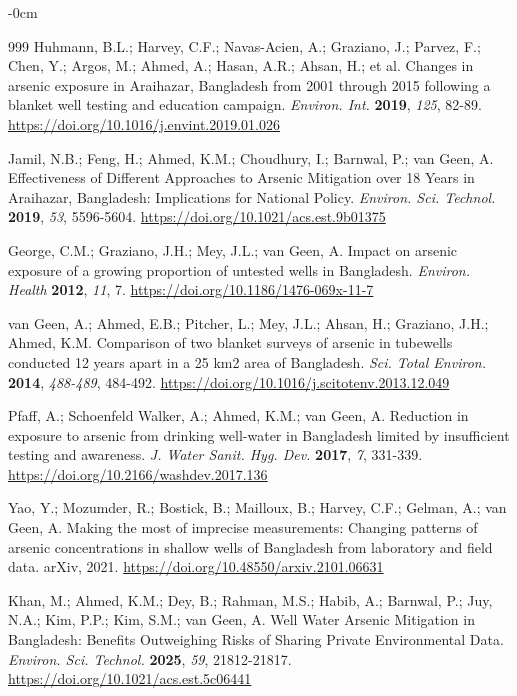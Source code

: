 \documentclass[sustainability,article,submit,pdftex,moreauthors]{Definitions/mdpi}
\begin{document}
\begin{adjustwidth}{-\extralength}{0cm}
\begin{thebibliography}{999}
Huhmann, B.L.; Harvey, C.F.; Navas-Acien, A.; Graziano, J.; Parvez, F.; Chen, Y.; Argos, M.; Ahmed, A.; Hasan, A.R.; Ahsan, H.; et al. Changes in arsenic exposure in Araihazar, Bangladesh from 2001 through 2015 following a blanket well testing and education campaign. \textit{Environ. Int.} \textbf{2019}, \textit{125}, 82-89. \url{https://doi.org/10.1016/j.envint.2019.01.026}

Jamil, N.B.; Feng, H.; Ahmed, K.M.; Choudhury, I.; Barnwal, P.; van Geen, A. Effectiveness of Different Approaches to Arsenic Mitigation over 18 Years in Araihazar, Bangladesh: Implications for National Policy. \textit{Environ. Sci. Technol.} \textbf{2019}, \textit{53}, 5596-5604. \url{https://doi.org/10.1021/acs.est.9b01375}

George, C.M.; Graziano, J.H.; Mey, J.L.; van Geen, A. Impact on arsenic exposure of a growing proportion of untested wells in Bangladesh. \textit{Environ. Health} \textbf{2012}, \textit{11}, 7. \url{https://doi.org/10.1186/1476-069x-11-7}

van Geen, A.; Ahmed, E.B.; Pitcher, L.; Mey, J.L.; Ahsan, H.; Graziano, J.H.; Ahmed, K.M. Comparison of two blanket surveys of arsenic in tubewells conducted 12 years apart in a 25 km2 area of Bangladesh. \textit{Sci. Total Environ.} \textbf{2014}, \textit{488-489}, 484-492. \url{https://doi.org/10.1016/j.scitotenv.2013.12.049}

Pfaff, A.; Schoenfeld Walker, A.; Ahmed, K.M.; van Geen, A. Reduction in exposure to arsenic from drinking well-water in Bangladesh limited by insufficient testing and awareness. \textit{J. Water Sanit. Hyg. Dev.} \textbf{2017}, \textit{7}, 331-339. \url{https://doi.org/10.2166/washdev.2017.136}

Yao, Y.; Mozumder, R.; Bostick, B.; Mailloux, B.; Harvey, C.F.; Gelman, A.; van Geen, A. Making the most of imprecise measurements: Changing patterns of arsenic concentrations in shallow wells of Bangladesh from laboratory and field data. arXiv, 2021. \url{https://doi.org/10.48550/arxiv.2101.06631}

Khan, M.; Ahmed, K.M.; Dey, B.; Rahman, M.S.; Habib, A.; Barnwal, P.; Juy, N.A.; Kim, P.P.; Kim, S.M.; van Geen, A. Well Water Arsenic Mitigation in Bangladesh: Benefits Outweighing Risks of Sharing Private Environmental Data. \textit{Environ. Sci. Technol.} \textbf{2025}, \textit{59}, 21812-21817. \url{https://doi.org/10.1021/acs.est.5c06441}


\end{thebibliography}
\end{adjustwidth}
\end{document}
